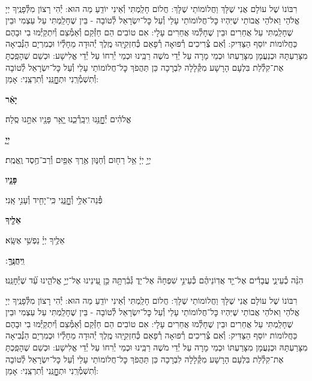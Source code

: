 \documentclass[twoside, openany, parskip=half, 11pt]{book}
\begin{document}
\\

רִבּוֹנוֹ שֶׁל עוֹלָם אֲנִי שֶׁלָּךְ וַחֲלוֹמוֹתַי שֶׁלָּךְ: חֲלוֹם חָלַֽמְתִּי וְ֯אֵינִי יוֹדֵֽעַ מַה הוּא: יְ֯הִי רָצוֹן מִלְּ֯פָנֶֽיךָ יְיָ אֱלֹהַי וֵאלֹהֵי אֲבוֹתַי שֶׁיִּהְיוּ כׇּל־חֲלוֹמוֹתַי עָלַי וְ֯עַל כׇּל־יִשְׂרָאֵל לְ֯טוֹבָה - בֵּין שֶׁחָלַֽמְתִּי עַל עַצְמִי וּבֵין שֶׁחָלַֽמְתִּי עַל אֲחֵרִים וּבֵין שֶׁחָלְ֯מוּ אֲחֵרִים עָלָי: אִם טוֹבִים הֵם חַזְּ֯קֵם וְ֯אַמְּ֯צֵם וְ֯יִתְקַיְּ֯מוּ בִי וּבָהֶם כַּחֲלוֹמוֹת יוֹסֵף הַצַּדִּיק: וְ֯אִם צְ֯רִיכִים רְ֯פוּאָה רְ֯פָאֵם כְּ֯חִזְקִיָּֽהוּ מֶֽלֶךְ יְ֯הוּדָה מֵחָלְ֯יוֹ וּכְמִרְיָם הַנְּ֯בִיאָה מִצָּרַעְתָּהּ וּכְנַעֲמָן מִצָּרַעְתּוֹ וּכְמֵי מָרָה עַל יְ֯דֵי מֹשֶׁה רַבֵּֽינוּ וּכְמֵי יְ֯רִחוֹ עַל יְ֯דֵי אֱלִישָׁע: וּכְשֵׁם שֶׁהָפַֽכְתָּ אֶת־קִלְ֯לַת בִּלְעָם הָרָשָׁע מִקְּ֯לָלָה לִבְרָכָה כֵּן תַּהֲפֹךְ כׇּל־חֲלוֹמוֹתַי עָלַי וְ֯עַל כׇּל־יִשְׂרָאֵל לְ֯טוֹבָה וְ֯תִשְׁמְ֯רֵֽנִי וּתְחׇׇׇׇׇׇנֵּֽנִי וְ֯תִרְצֵֽנִי: אָמֵן:



\textbf{יָאֵ֨ר}
\hfill \begin{footnotesize}
אֱלֹהִ֗ים יְ֯חׇׇׇׇׇנֵּ֥נוּ וִֽיבָֽרְ֯כֵ֑נוּ יָ֤אֵ֥ר פָּנָ֖יו אִתָּ֣נוּ סֶֽלָה׃\\
\end{footnotesize}
\textbf{יְיָ֧}
\hfill \begin{footnotesize}
יְיָ֣ יְיָ֔ אֵ֥ל רַח֖וּם וְ֯חַנּ֑וּן אֶ֥רֶךְ אַפַּ֖יִם וְ֯רַב־חֶ֥סֶד וֶֽאֱמֶֽת׃\\
\end{footnotesize}
\textbf{פָּנָ֛יו}
\hfill \begin{footnotesize}
פְּ֯נֵה־אֵלַ֥י וְ֯חׇׇׇׇׇׇנֵּ֑נִי כִּֽי־יָחִ֖יד וְ֯עָנִ֣י אָֽנִי׃\\
\end{footnotesize}
\textbf{אֵלֶ֖יךָ}
\hfill \begin{footnotesize}
אֵלֶ֥יךָ יְיָ֗ נַפְשִׁ֥י אֶשָּֽׂא׃\\
\end{footnotesize}
\textbf{וִֽיחֻנֶּֽךָּ}
׃ \hfill \begin{footnotesize}
הִנֵּ֨ה כְ֯עֵינֵ֢י עֲבָדִ֡ים אֶל־יַ֤ד אֲדֽוֹנֵיהֶ֗ם כְּ֯עֵינֵ֣י שִׁפְחָה֘ אֶל־יַד֢ גְּ֯בִ֫רְתָּ֥הּ כֵּ֣ן עֵ֭ינֵינוּ אֶל־יְיָ֣ אֱלֹהֵ֑ינוּ עַ֝֗ד שֶׁיְּ֯חׇנֵּֽנוּ׃
\end{footnotesize}


רִבּוֹנוֹ שֶׁל עוֹלָם אֲנִי שֶׁלָּךְ וַחֲלוֹמוֹתַי שֶׁלָּךְ: חֲלוֹם חָלַֽמְתִּי וְ֯אֵינִי יוֹדֵֽעַ מַה הוּא: יְ֯הִי רָצוֹן מִלְּ֯פָנֶֽיךָ יְיָ אֱלֹהַי וֵאלֹהֵי אֲבוֹתַי שֶׁיִּהְיוּ כׇּל־חֲלוֹמוֹתַי עָלַי וְ֯עַל כׇּל־יִשְׂרָאֵל לְ֯טוֹבָה - בֵּין שֶׁחָלַֽמְתִּי עַל עַצְמִי וּבֵין שֶׁחָלַֽמְתִּי עַל אֲחֵרִים וּבֵין שֶׁחָלְ֯מוּ אֲחֵרִים עָלָי: אִם טוֹבִים הֵם חַזְּ֯קֵם וְ֯אַמְּ֯צֵם וְ֯יִתְקַיְּ֯מוּ בִי וּבָהֶם כַּחֲלוֹמוֹת יוֹסֵף הַצַּדִּיק: וְ֯אִם צְ֯רִיכִים רְ֯פוּאָה רְ֯פָאֵם כְּ֯חִזְקִיָּֽהוּ מֶֽלֶךְ יְ֯הוּדָה מֵחָלְ֯יוֹ וּכְמִרְיָם הַנְּ֯בִיאָה מִצָּרַעְתָּהּ וּכְנַעֲמָן מִצָּרַעְתּוֹ וּכְמֵי מָרָה עַל יְ֯דֵי מֹשֶׁה רַבֵּֽינוּ וּכְמֵי יְ֯רִחוֹ עַל יְ֯דֵי אֱלִישָׁע: וּכְשֵׁם שֶׁהָפַֽכְתָּ אֶת־קִלְ֯לַת בִּלְעָם הָרָשָׁע מִקְּ֯לָלָה לִבְרָכָה כֵּן תַּהֲפֹךְ כׇּל־חֲלוֹמוֹתַי עָלַי וְ֯עַל כׇּל־יִשְׂרָאֵל לְ֯טוֹבָה וְ֯תִשְׁמְ֯רֵֽנִי וּתְחׇׇׇׇׇׇנֵּֽנִי וְ֯תִרְצֵֽנִי: אָמֵן:
\end{document}
